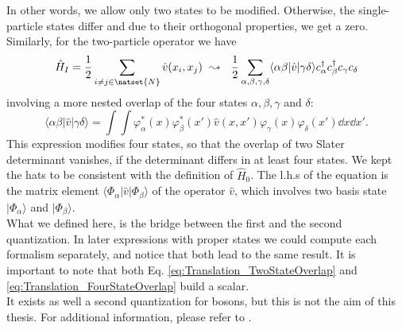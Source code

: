 \documentclass[../main.tex]{subfile}
\begin{document}
In other words, we allow only two states to be modified. Otherwise, the single-particle
states differ and due to their orthogonal properties, we get a zero.\\

Similarly, for the two-particle operator we have
\begin{equation}\label{eq:SecondquantizationDoubleParticle}
    \hat{H}_I = \frac{1}{2}\sum_{i\neq j \in \natset{N}} \hat{v}(x_i, x_j) ~ \leadsto ~~ \frac{1}{2}\sum_{\alpha,\beta,\gamma,\delta} \langle \alpha\beta|\hat{v}|\gamma\delta\rangle c_{\alpha}^{\dagger}c_{\beta}^{\dagger}c_{\gamma}c_{\delta}
\end{equation}
involving a more nested overlap of the four states $\alpha,\beta,\gamma$ and $\delta$:
\begin{equation}\label{eq:Translation_FourStateOverlap}
    \langle\alpha\beta|\hat{v}|\gamma\delta\rangle = \int \int \varphi_{\alpha}^{\ast}(x) \varphi_{\beta}^{\ast}(x') \hat{v}(x,x') \varphi_{\gamma}(x) \varphi_{\delta}(x') \dd x \dd x'.
\end{equation}
This expression modifies four states, so that the overlap of two Slater determinant vanishes, if the determinant differs in at least four states. We kept the hats
to be consistent with the definition of $\hat{H}_0$. The l.h.s of the equation is the matrix element $\langle\Phi_{\alpha}|\hat{v}|\Phi_{\beta}\rangle$ of the operator
 $\hat{v}$, which involves two basis state $|\Phi_{\alpha}\rangle$ and $|\Phi_{\beta}\rangle$.\\
 
What we defined here, is the bridge between the first and the second quantization. In later expressions with proper states we could compute each formalism separately, 
and notice that both lead to the same result. It is important to note that both Eq. \ref{eq:Translation_TwoStateOverlap} and \ref{eq:Translation_FourStateOverlap}
build a scalar.\\

It exists as well a second quantization for bosons, but this is not the aim of this thesis. For additional information, please refer to \cite{Folk2014}.
\end{document}
